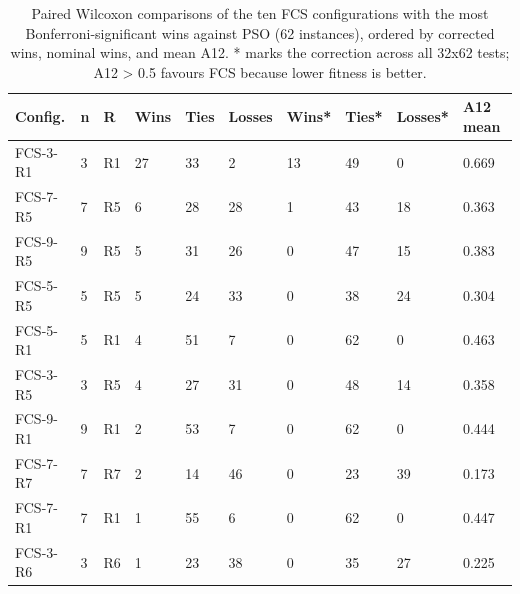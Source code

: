 \begin{table}[h]
\centering
\caption{Paired Wilcoxon comparisons of the ten FCS configurations with the most Bonferroni-significant wins against PSO (62 instances), ordered by corrected wins, nominal wins, and mean A12. * marks the correction across all 32x62 tests; A12 \textgreater{} 0.5 favours FCS because lower fitness is better.}
\label{tab:h4_wilcoxon}
\begin{tabular}{llllllllll}
\toprule
Config. & n & R & Wins & Ties & Losses & Wins* & Ties* & Losses* & A12 mean \\
\midrule
FCS-3-R1 & 3 & R1 & 27 & 33 & 2 & 13 & 49 & 0 & 0.669 \\
FCS-7-R5 & 7 & R5 & 6 & 28 & 28 & 1 & 43 & 18 & 0.363 \\
FCS-9-R5 & 9 & R5 & 5 & 31 & 26 & 0 & 47 & 15 & 0.383 \\
FCS-5-R5 & 5 & R5 & 5 & 24 & 33 & 0 & 38 & 24 & 0.304 \\
FCS-5-R1 & 5 & R1 & 4 & 51 & 7 & 0 & 62 & 0 & 0.463 \\
FCS-3-R5 & 3 & R5 & 4 & 27 & 31 & 0 & 48 & 14 & 0.358 \\
FCS-9-R1 & 9 & R1 & 2 & 53 & 7 & 0 & 62 & 0 & 0.444 \\
FCS-7-R7 & 7 & R7 & 2 & 14 & 46 & 0 & 23 & 39 & 0.173 \\
FCS-7-R1 & 7 & R1 & 1 & 55 & 6 & 0 & 62 & 0 & 0.447 \\
FCS-3-R6 & 3 & R6 & 1 & 23 & 38 & 0 & 35 & 27 & 0.225 \\
\bottomrule
\end{tabular}
\end{table}

